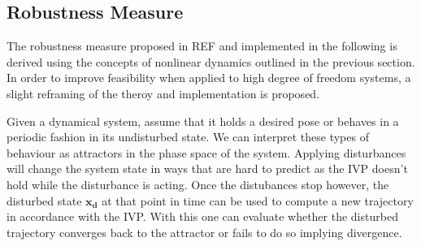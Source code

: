 




     
     

    

    

\subsection{Robustness Measure} \label{robustnessmeasure}

    The robustness measure proposed in REF and implemented in the following is derived using the concepts of nonlinear dynamics outlined in the previous section. In order to improve feasibility when applied to high degree of freedom systems, a slight reframing of the theroy and implementation is proposed.
    
    Given a dynamical system, assume that it holds a desired pose or behaves in a periodic fashion in its undisturbed state. We can interpret these types of behaviour as attractors in the phase space of the system. Applying disturbances will change the system state in ways that are hard to predict as the IVP doesn't hold while the disturbance is acting. Once the distubances stop however, the disturbed state $\mathbf{x_d}$ at that point in time can be used to compute a new trajectory in accordance with the IVP. With this one can evaluate whether the disturbed trajectory converges back to the attractor or fails to do so implying divergence. %


